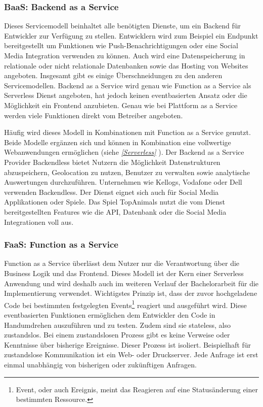    \subsubsection{BaaS: Backend as a Service}
   Dieses Servicemodell beinhaltet alle benötigten Dienste, um ein Backend für Entwickler zur Verfügung zu stellen.
   Entwicklern wird zum Beispiel ein Endpunkt bereitgestellt um Funktionen wie Push-Benachrichtigungen oder eine Social Media Integration verwenden zu können.
   Auch wird eine Datenspeicherung in relationale oder nicht relationale Datenbanken sowie das Hosting von Websites angeboten. Insgesamt gibt es einige Überschneidungen zu den anderen Servicemodellen.
   Backend as a Service wird genau wie Function as a Service als Serverless Dienst angeboten, hat jedoch keinen eventbasierten Ansatz oder die Möglichkeit ein Frontend anzubieten.
   Genau wie bei Plattform as a Service werden viele Funktionen direkt vom Betreiber angeboten.

   Häufig wird dieses Modell in Kombinationen mit Function as a Service genutzt. Beide Modelle ergänzen sich und können in Kombination eine vollwertige
   Webanwendungen ermöglichen (siehe \textit{\ref{Serverless} }).
   Der Backend as a Service Provider Backendless bietet Nutzern die Möglichkeit Datenstrukturen abzuspeichern, Geolocation zu nutzen,
   Benutzer zu verwalten sowie analytische Auswertungen durchzuführen. Unternehmen wie Kellogs, Vodafone oder Dell verwenden Backendless.
   Der Dienst eignet sich auch für Social Media Applikationen oder Spiele. Das Spiel TopAnimals nutzt die vom Dienst bereitgestellten Features wie
   die API, Datenbank oder die Social Media Integrationen voll aus. \cite{Backendless}


   \subsubsection{FaaS: Function as a Service}
   \label{FaaS}
   Function as a Service überlässt dem Nutzer nur die Verantwortung über die Business Logik und das Frontend.
   Dieses Modell ist der Kern einer Serverless Anwendung und wird deshalb auch im weiteren Verlauf der Bachelorarbeit für die Implementierung verwendet.
   Wichtigstes Prinzip ist, dass der zuvor hochgeladene Code bei bestimmten festgelegten Events\footnote{Event, oder auch Ereignis, meint das Reagieren auf eine Statusänderung einer bestimmten Ressource.} reagiert und ausgeführt wird.
   Diese eventbasierten Funktionen ermöglichen dem Entwickler den Code in Handumdrehen auszuführen und zu testen.
   Zudem sind sie stateless, also zustandslos. Bei einem zustandslosen Prozess gibt es keine Verweise oder Kenntnisse über bisherige Ereignisse.
   Dieser Prozess ist isoliert. Beispielhaft für zustandslose Kommunikation ist ein Web- oder Druckserver.
   Jede Anfrage ist erst einmal unabhängig von bisherigen oder zukünftigen Anfragen.\cite{Zustandslos}

